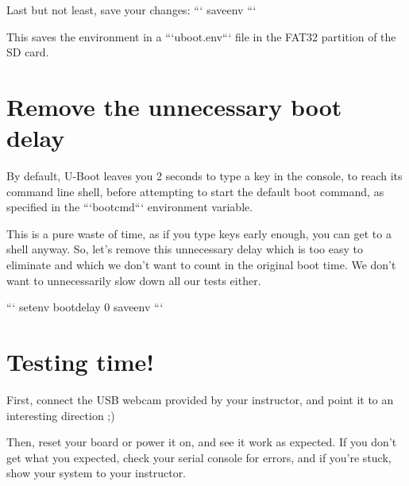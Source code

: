 Last but not least, save your changes:
```
saveenv
```

This saves the environment in a ```uboot.env``` file in the FAT32
partition of the SD card.

\section{Remove the unnecessary boot delay}

By default, U-Boot leaves you 2 seconds to type a key in the console,
to reach its command line shell, before attempting to start the
default boot command, as specified in the ```bootcmd``` environment
variable.

This is a pure waste of time, as if you type keys early enough, you
can get to a shell anyway. So, let’s remove this unnecessary delay
which is too easy to eliminate and which we don’t want to count in
the original boot time. We don’t want to unnecessarily slow down
all our tests either.

```
setenv bootdelay 0
saveenv
```

\section{Testing time!}

First, connect the USB webcam provided by your instructor, and point it
to an interesting direction ;)

Then, reset your board or power it on, and see it work as expected. If
you don't get what you expected, check your serial console for errors,
and if you're stuck, show your system to your instructor.
